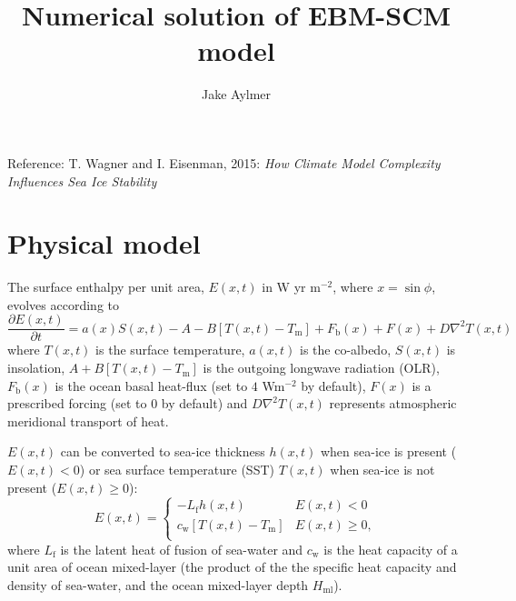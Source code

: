 \documentclass[12pt]{article}
\begin{document}
\thispagestyle{empty}

\title{Numerical solution of EBM-SCM model}
\author{Jake Aylmer}
\maketitle
\large
\begin{center}
Reference: T. Wagner and I. Eisenman, 2015: \textit{How Climate Model Complexity Influences Sea Ice Stability}
\end{center}
\normalsize

\section{Physical model}
The surface enthalpy per unit area, $E(x,t)$ in W yr m$^{-2}$, where $x=\sin \phi$, evolves according to
\begin{equation}\label{eq:surfaceenthalpy}
\frac{\partial E(x,t)}{\partial t} = a(x)S(x,t) - A - B\left[T(x,t)-T_\mathrm{m}\right] + F_\mathrm{b}(x) + F(x) + D\nabla^2T(x,t)
\end{equation}
where $T(x,t)$ is the surface temperature, $a(x,t)$ is the co-albedo, $S(x,t)$ is insolation, $A+B\left[T(x,t)-T_\mathrm{m}\right]$ is the outgoing longwave radiation (OLR), $F_\mathrm{b}(x)$ is the ocean basal heat-flux (set to $4$ Wm$^{-2}$ by default), $F(x)$ is a prescribed forcing (set to $0$ by default) and $D\nabla^2T(x,t)$ represents atmospheric meridional transport of heat.

$E(x,t)$ can be converted to sea-ice thickness $h(x,t)$ when sea-ice is present ($E(x,t)<0$) or sea surface temperature (SST) $T(x,t)$ when sea-ice is not present ($E(x,t)\geq 0$):
\begin{equation}\label{eq:convertE}
E(x,t) = \begin{cases}
    -L_\mathrm{f}h(x,t) & E(x,t) < 0 \\
    c_\mathrm{w}\left[T(x,t)-T_\mathrm{m}\right] & E(x,t) \geq 0, \\
    \end{cases}
\end{equation}
where $L_\mathrm{f}$ is the latent heat of fusion of sea-water and $c_\mathrm{w}$ is the heat capacity of a unit area of ocean mixed-layer (the product of the the specific heat capacity and density of sea-water, and the ocean mixed-layer depth $H_\mathrm{ml}$).


\end{document}

